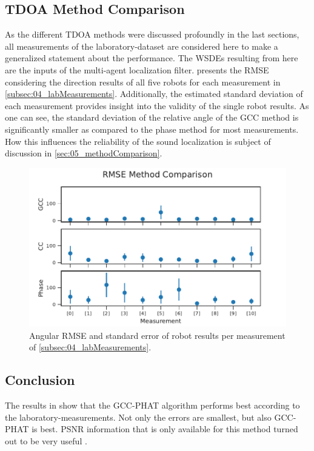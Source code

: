\subsection{\ac{TDOA} Method Comparison}
\label{subsec:04_singleRobotAngleError}

As the different \ac{TDOA} methods were discussed profoundly in the last
sections, all measurements of the laboratory-dataset are considered here
to make a generalized statement about the performance.
The \acp{WSDE} resulting from here are the inputs of the multi-agent
localization filter.
 presents the \ac{RMSE} considering the
direction results of all five robots for each measurement in
\cref{subsec:04_labMeasurements}.
Additionally, the estimated standard deviation of each measurement
provides insight into the validity of the single robot results.
As one can see, the standard deviation of the relative angle of the \ac{GCC}
method is significantly smaller as compared to the phase method for most
measurements.
How this influences the reliability of the sound localization is
subject of discussion in \cref{sec:05_methodComparison}.
\begin{figure}[ht]
	\centering
		\includegraphics[]{figures/evaluation/compare_rmse}
	\caption{Angular RMSE and standard error of robot results per
	measurement of \cref{subsec:04_labMeasurements}.}
    \label{fig:04_compareRmse}
\end{figure}

\subsection{Conclusion}
\label{subsec:04_tdoaConclusion}

The results in  show
that the \ac{GCC-PHAT} algorithm performs best according to the
laboratory-measurements.
Not only the errors are smallest, but also 
\ac{GCC-PHAT} is best. \ac{PSNR} information that is only available for this method turned out
to be very useful .